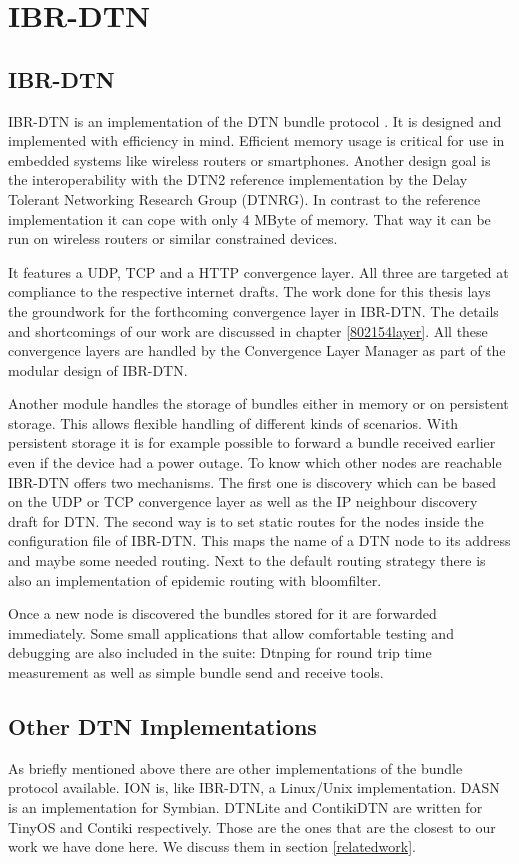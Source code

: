 \chapter{IBR-DTN}
\label{ibr-dtn}
\section{IBR-DTN}

IBR-DTN is an implementation of the DTN bundle protocol \cite{RFC5050}. It is
designed and implemented with efficiency in mind. Efficient memory usage is critical
for use in embedded systems like wireless routers or smartphones. Another design
goal is the interoperability with the DTN2 reference implementation by the Delay
Tolerant Networking Research Group (DTNRG). In contrast to the reference
implementation it can cope with only 4 MByte of memory. That way it can be run
on wireless routers or similar constrained devices.

It features a UDP, TCP and a HTTP convergence layer. All three are targeted at
compliance to the respective internet drafts. The work done for this thesis lays
the groundwork for the forthcoming convergence layer in IBR-DTN. The details and
shortcomings of our work are discussed in chapter \ref{802154layer}. All these
convergence layers are handled by the Convergence Layer Manager as part of the
modular design of IBR-DTN.

Another module handles the storage of bundles either in memory or on persistent
storage. This allows flexible handling of different kinds of scenarios. With
persistent storage it is for example possible to forward a bundle received earlier
even if the device had a power outage. To know which other nodes are reachable
IBR-DTN offers two mechanisms. The first one is discovery which can be based on
the UDP or TCP convergence layer as well as the IP neighbour discovery draft for
DTN. The second way is to set static routes for the nodes inside the
configuration file of IBR-DTN. This maps the name of a DTN node to its address
and maybe some needed routing. Next to the default routing strategy there is
also an implementation of epidemic routing with bloomfilter.

Once a new node is discovered the bundles stored for it are forwarded immediately.
Some small applications that allow comfortable testing and debugging are also
included in the suite: Dtnping for round trip time measurement as well as simple bundle
send and receive tools.

\section{Other DTN Implementations}

As briefly mentioned above there are other implementations of the bundle
protocol available. ION is, like IBR-DTN, a Linux/Unix implementation. DASN is
an implementation for Symbian. DTNLite and ContikiDTN are written for TinyOS and
Contiki respectively. Those are the ones that are the closest to our work we
have done here. We discuss them in section \ref{relatedwork}.
